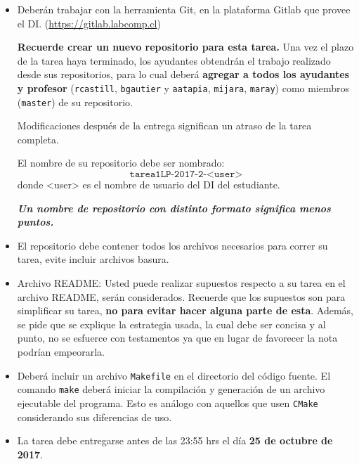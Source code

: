 \documentclass[letterpaper,10pt]{article}
\begin{document}
\begin{itemize}
    \item
        Deberán trabajar con la herramienta Git, en la plataforma Gitlab que provee el DI. (\url{https://gitlab.labcomp.cl})
        
\textbf{Recuerde crear un nuevo repositorio para esta tarea.}
        Una vez el plazo de la tarea haya terminado, los ayudantes obtendrán el trabajo realizado
        desde sus repositorios, para lo cual deberá \textbf{agregar a todos los ayudantes y profesor} (\texttt{rcastill}, \texttt{bgautier} y \texttt{aatapia}, \texttt{mijara}, \texttt{maray}) como miembros (\texttt{master}) de su repositorio.

        Modificaciones después de la entrega significan un atraso de la tarea completa.
        
        El nombre de su repositorio debe ser nombrado: 
        $$\texttt{tarea1LP-2017-2-<user>}$$ donde <user> es el nombre de usuario del DI del estudiante.
        
        \textit{\textbf{Un nombre de repositorio con distinto formato significa menos puntos.}}

    \item
        El repositorio debe contener todos los archivos necesarios para correr su tarea, evite incluir archivos basura.

    \item Archivo README:
        Usted puede realizar supuestos respecto a su tarea en el archivo README, serán considerados. Recuerde que los supuestos son para simplificar su tarea, \textbf{no para evitar hacer alguna parte de esta}. Además, se pide que se explique la estrategia usada, la cual debe ser concisa y al punto, no se esfuerce con testamentos ya que en lugar de favorecer la nota podrían empeorarla.
    
    \item 
        Deberá incluir un archivo \texttt{Makefile} en el directorio del código fuente. El comando \texttt{make} deberá iniciar la compilación y generación de un archivo ejecutable del programa. Esto es análogo con aquellos que usen \texttt{CMake} considerando sus diferencias de uso.
    
    \item
        La tarea debe entregarse antes de las 23:55 hrs el día \textbf{25 de octubre de 2017}.
\end{itemize}

\end{document}
